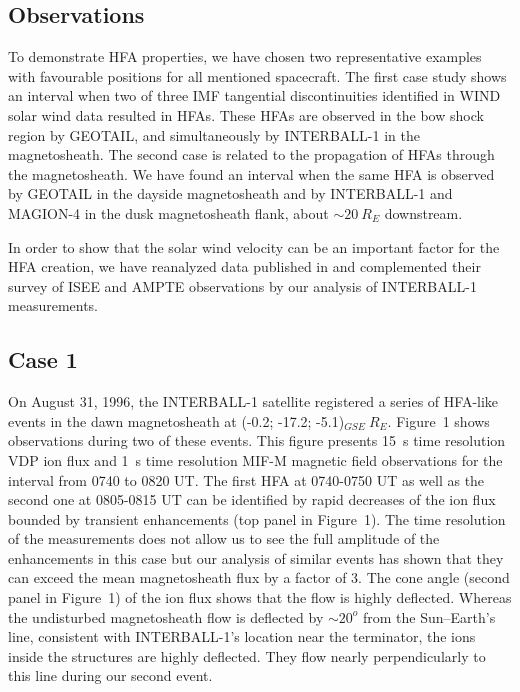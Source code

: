 \documentclass{article}
\begin{document}
\begin{article}
\section{Observations}
To demonstrate HFA properties, we have chosen two representative
examples with favourable positions for all mentioned spacecraft.
The first case study shows an interval when two of three IMF tangential
discontinuities identified in WIND solar wind data resulted in HFAs.
These HFAs are observed in the bow shock region by GEOTAIL,
and simultaneously by
INTERBALL-1 in the magnetosheath. The second case is related to the
propagation of HFAs through the magnetosheath. We have found an
interval when the same HFA is observed by GEOTAIL in the dayside
magnetosheath and by INTERBALL-1 and MAGION-4 in the dusk
magnetosheath flank, about $\sim 20\> R_E$ downstream.

In order to
show that the solar wind velocity can be an important factor for the
HFA creation, we have reanalyzed data published in
\citep{ona} and
complemented their survey of ISEE and AMPTE observations by our
analysis of INTERBALL-1 measurements.

\subsection{Case 1}
On August 31, 1996, the INTERBALL-1 satellite
registered a series of HFA-like events in the dawn magnetosheath
at (-0.2; -17.2; -5.1)$_{GSE}\> R_E$. Figure~1 shows observations during two of
these events.  This figure presents 15~s
time resolution VDP ion flux \citep{ku} and 1~s time resolution MIF-M magnetic field
\citep{kl} observations for the interval
from 0740 to 0820 UT.
The first HFA at 0740-0750 UT as well as the second one at
0805-0815 UT can be identified by rapid decreases of the ion flux
bounded by transient enhancements (top panel in Figure~1). The time
resolution of the measurements does not allow us to see the full
amplitude of the enhancements in this case but our analysis of
similar events has shown that they can exceed the mean magnetosheath flux
by a factor of 3.
The cone angle (second panel in Figure~1) of the ion flux shows
that the flow is highly deflected. Whereas the undisturbed
magnetosheath flow is deflected by $\sim 20^o$ from the
Sun--Earth's line, consistent with INTERBALL-1's location near
the terminator, the ions inside the structures are highly
deflected. They flow nearly perpendicularly to this line during our
second event.


\end{article}
\end{document}
